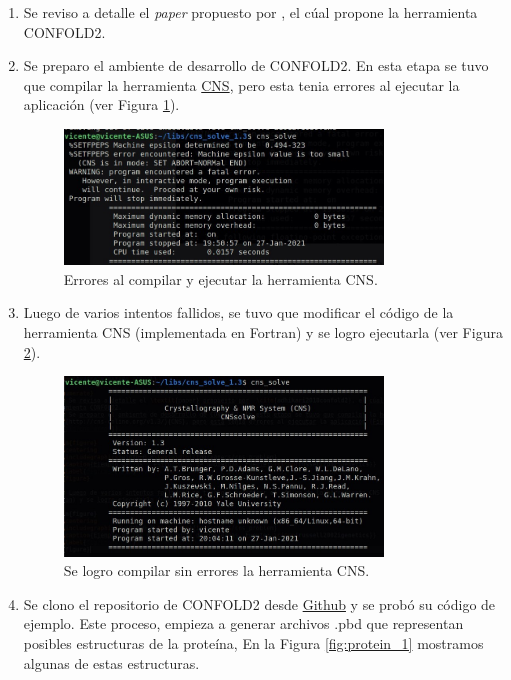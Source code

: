\documentclass{article}
\begin{document}
	\begin{enumerate}
		\item Se reviso a detalle el \textit{paper} propuesto por  \cite{adhikari2018confold2}, el cúal propone la herramienta CONFOLD2. 
		\item Se preparo el ambiente de desarrollo de CONFOLD2. En esta etapa se tuvo que compilar la herramienta  \href{http://cns-online.org/v1.3/}{CNS}, pero esta tenia errores al ejecutar la aplicación (ver Figura \ref{fig:cns_error}). 
		
		\begin{figure}
			\centering
			\includegraphics[width=0.8\textwidth]{img/papers/cns_problem}
			\caption{Errores al compilar y ejecutar la herramienta CNS.}
			\label{fig:cns_error}
		\end{figure}
		
		\item Luego de varios intentos fallidos, se tuvo que modificar el código de la herramienta CNS (implementada en Fortran) y se logro ejecutarla (ver Figura \ref{fig:cns}).
		
		\begin{figure}
			\centering
			\includegraphics[width=0.8\textwidth]{img/papers/cns}
			\caption{Se logro compilar sin errores la herramienta CNS.}
			\label{fig:cns}
		\end{figure}
	
		\item Se clono el repositorio de CONFOLD2 desde \href{https://github.com/multicom-toolbox/CONFOLD2}{Github} y se probó su código de ejemplo. Este proceso, empieza a generar archivos .pbd que representan posibles estructuras de la proteína, En la Figura \ref{fig:protein_1} mostramos algunas de estas estructuras. 
		

\end{enumerate}
\end{document}
